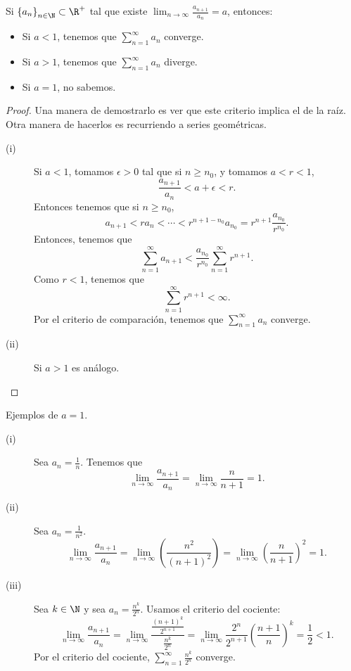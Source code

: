 \begin{ftheorem}
	\normalfont Si $\displaystyle \left\{ a_{n}\right\} _{n\in\N}\subset\R^{+} $ tal que existe $\displaystyle \lim_{n \to \infty}\frac{a_{n+1}}{a_{n}} = a $, entonces:
\begin{itemize}
\item Si $\displaystyle a < 1 $, tenemos que $\displaystyle \sum^{\infty}_{n = 1}a_{n} $ converge.
\item Si $\displaystyle a > 1 $, tenemos que $\displaystyle \sum^{\infty}_{n = 1}a_{n} $ diverge.
\item Si $\displaystyle a = 1 $, no sabemos.
\end{itemize}
\end{ftheorem}

\begin{proof}
Una manera de demostrarlo es ver que este criterio implica el de la raíz. Otra manera de hacerlos es recurriendo a series geométricas. 
\begin{description}
\item[(i)] Si $\displaystyle a < 1 $, tomamos $\displaystyle \epsilon > 0 $ tal que si $\displaystyle n \geq n_{0} $, y tomamos $\displaystyle a < r < 1 $,
	\[ \frac{a_{n+1}}{a_{n}}<a+\epsilon < r .\]
Entonces tenemos que si $\displaystyle n \geq n_{0} $, 
\[a_{n+1} < ra_{n} < \cdots < r^{n+1-n_{0}}a_{n_{0}} = r^{n+1}\frac{a_{n_{0}}}{r^{n_{0}}}.\]
Entonces, tenemos que 
\[\sum^{\infty}_{n =1}a_{n+1} < \frac{a_{n_{0}}}{r^{n_{0}}}\sum^{\infty}_{n = 1}r^{n+1} .\]
Como $\displaystyle r < 1 $, tenemos que 
\[\sum^{\infty}_{n = 1}r^{n+1} <\infty .\]
Por el criterio de comparación, tenemos que $\displaystyle \sum^{\infty}_{n = 1}a_{n} $ converge.
\item[(ii)] Si $\displaystyle a > 1 $ es análogo.
\end{description}
\end{proof}

\begin{eg}
\normalfont Ejemplos de $\displaystyle a = 1 $. 
\begin{description}
\item[(i)] Sea $\displaystyle a_{n} = \frac{1}{n} $. Tenemos que 
	\[\lim_{n \to \infty}\frac{a_{n+1}}{a_{n}} = \lim_{n \to \infty}\frac{n}{n+1} = 1 .\]
\item[(ii)] Sea $\displaystyle a_{n} = \frac{1}{n^{2}} $. 
	\[\lim_{n \to \infty}\frac{a_{n+1}}{a_{n}} = \lim_{n \to \infty}\left(\frac{n^{2}}{\left(n+1\right)^{2}}\right) = \lim_{n \to \infty}\left(\frac{n}{n+1}\right)^{2} = 1 .\]
\item[(iii)] Sea $\displaystyle k \in \N $ y sea $\displaystyle a_{n} = \frac{n^{k}}{2^{n}} $. Usamos el criterio del cociente:
	\[\lim_{n \to \infty}\frac{a_{n+1}}{a_{n}} = \lim_{n \to \infty}\frac{\frac{\left(n+1\right)^{k}}{2^{n+1}}}{\frac{n^{k}}{2^{n}}} = \lim_{n \to \infty} \frac{2^{n}}{2^{n+1}}\left(\frac{n+1}{n}\right)^{k} = \frac{1}{2}<1 .\]
Por el criterio del cociente, $\displaystyle \sum^{\infty}_{n = 1}\frac{n^{k}}{2^{n}} $ converge.
\end{description}
\end{eg}

